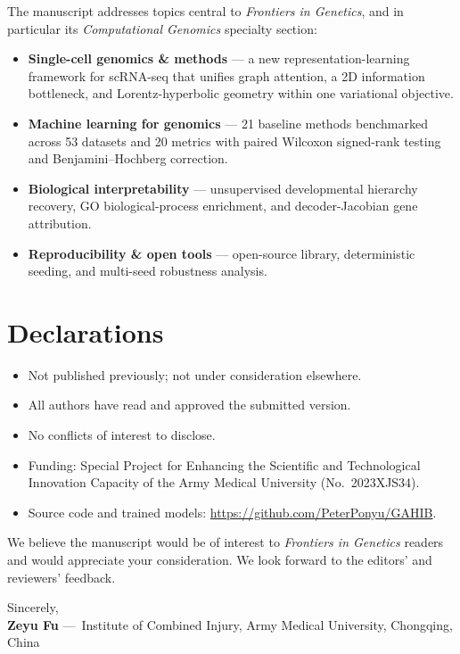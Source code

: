 \documentclass[11pt,a4paper]{article}
\newcommand{\journalShort}{\emph{Frontiers in Genetics}}
\newcommand{\journalScope}{%
The manuscript addresses topics central to \journalShort, and in
particular its \emph{Computational Genomics} specialty section:
\begin{itemize}[leftmargin=1.4em, itemsep=1pt, topsep=2pt]
  \item \textbf{Single-cell genomics \& methods} --- a new
    representation-learning framework for scRNA-seq that unifies
    graph attention, a 2D information bottleneck, and
    Lorentz-hyperbolic geometry within one variational objective.
  \item \textbf{Machine learning for genomics} --- 21 baseline methods
    benchmarked across 53 datasets and 20 metrics with paired
    Wilcoxon signed-rank testing and Benjamini--Hochberg correction.
  \item \textbf{Biological interpretability} --- unsupervised
    developmental hierarchy recovery, GO biological-process enrichment,
    and decoder-Jacobian gene attribution.
  \item \textbf{Reproducibility \& open tools} --- open-source library,
    deterministic seeding, and multi-seed robustness analysis.
\end{itemize}%
}
\begin{document}
\journalScope

\section*{Declarations}

\begin{itemize}[leftmargin=1.4em, itemsep=1pt, topsep=2pt]
  \item Not published previously; not under consideration elsewhere.
  \item All authors have read and approved the submitted version.
  \item No conflicts of interest to disclose.
  \item Funding: Special Project for Enhancing the Scientific and
    Technological Innovation Capacity of the Army Medical University
    (No.~2023XJS34).
  \item Source code and trained models:
    \url{https://github.com/PeterPonyu/GAHIB}.
\end{itemize}

\vspace{4pt}

\noindent
We believe the manuscript would be of interest to \journalShort{}
readers and would appreciate your consideration. We look forward to
the editors' and reviewers' feedback.

\vspace{12pt}

\noindent
Sincerely,\\[10pt]
{\bfseries\color{accentblue} Zeyu Fu}\hspace{0.6em}%
{\small\color{darkgray}---\ Institute of Combined Injury,
  Army Medical University, Chongqing, China}
\end{document}

